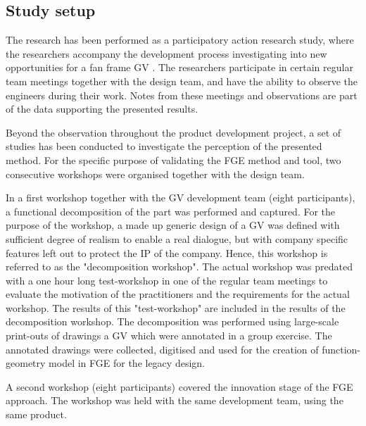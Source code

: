\documentclass[aerospace,article,submit,moreauthors,pdftex]{Definitions/mdpi}
\begin{document}
\subsection{Study setup}
The research has been performed as a participatory action research study, where the researchers accompany the development process investigating into new opportunities for a fan frame \ac{GV} \citep{Yin2006}.
The researchers participate in certain regular team meetings together with the design team, and have the ability to observe the engineers during their work.
Notes from these meetings and observations are part of the data supporting the presented results.


Beyond the observation throughout the product development project, a set of studies has been conducted to investigate the perception of the presented method.
For the specific  purpose of validating the FGE method and tool, two consecutive workshops were organised together with the design team. 

In a first workshop together with the \ac{GV} development team (eight participants), a functional decomposition of the part was performed and captured.
For the purpose of the workshop, a made up  generic design of a GV was defined with sufficient degree of realism to enable a real dialogue, but with company specific features left out to protect the \ac{IP} of the company.
Hence, this workshop is referred to as the "decomposition workshop".
The actual workshop was predated with a one hour long test-workshop in one of the regular team meetings to evaluate the motivation of the practitioners and the requirements for the actual workshop.
The results of this "test-workshop" are included in the results of the decomposition workshop.
The decomposition was performed using large-scale print-outs of drawings a \ac{GV} which were annotated in a group exercise.
The annotated drawings were collected, digitised and used for the creation of function-geometry model in \ac{FGE} for the legacy design.

A second workshop (eight participants) covered the innovation stage of the \ac{FGE} approach. 
The workshop was held with the same development team, using the same product.%
\end{document}
